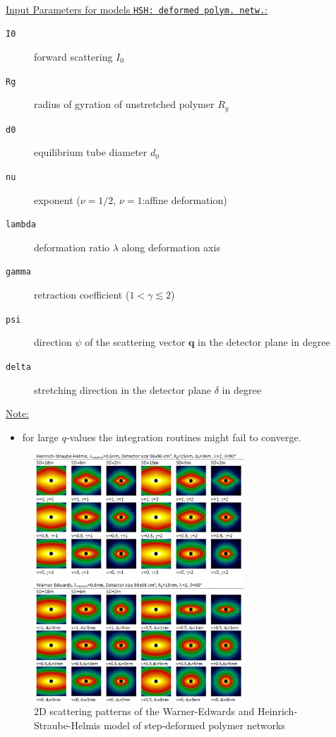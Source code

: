 \hspace{1pt}\\
\uline{Input Parameters for models \texttt{HSH: deformed polym. netw.}:}\\
\begin{description}
\item[\texttt{I0}] forward scattering $I_0$
\item[\texttt{Rg}] radius of gyration of unstretched polymer $R_g$
\item[\texttt{d0}] equilibrium tube diameter $d_0$
\item[\texttt{nu}] exponent ($\nu=1/2$, $\nu=1$:affine deformation)
\item[\texttt{lambda}] deformation ratio $\lambda$ along deformation axis

\item[\texttt{gamma}] retraction coefficient ($1 < \gamma \lesssim 2$)
\item[\texttt{psi}] direction $\psi$ of the scattering vector $\mathbf{q}$ in the detector plane in degree
\item[\texttt{delta}] stretching direction in the detector plane $\delta$ in degree
\end{description}

\uline{Note:}
\begin{itemize}
\item for large $q$-values the integration routines might fail to converge.
\end{itemize}

\begin{figure}[htb]
\begin{center}
\includegraphics[width=0.7\textwidth]{../images/form_factor/deformed_sheared/deformed_polymer_network.png}
\end{center}
\caption{2D scattering patterns of the Warner-Edwards and Heinrich-Straube-Helmis model of step-deformed polymer networks}
\label{fig:IQ2Dpolymernetwork}
\end{figure}


